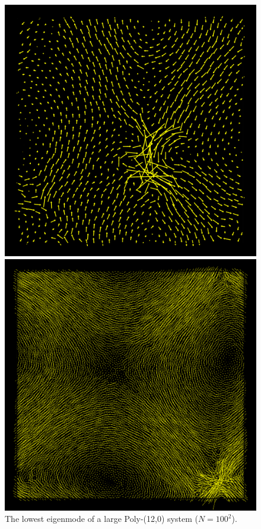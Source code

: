 \begin{frame}[c]
\begin{columns}[c]
\begin{column}{0.5\textwidth}
\begin{figure}
\begin{overprint}
\centering\includegraphics[height=0.7\textheight]{backup-simulationdetails/eigen_small.png}\caption{The lowest eigenmode of a small Poly-(12,0) system ($N=32^2$).}
\centering\includegraphics[height=0.7\textheight]{backup-simulationdetails/eigen_large.png}\caption{The lowest eigenmode of a large Poly-(12,0) system ($N=100^2$).}

\end{overprint}
\end{figure}
\end{column}
\end{columns}
\end{frame}
